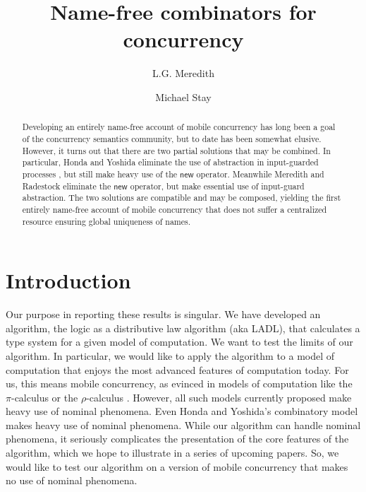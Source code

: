 \documentclass[submission,copyright,creativecommons]{eptcs}
\title{Name-free combinators for concurrency}
\author{L.G. Meredith
\institute{RChain Cooperative\\ Washington State}
\email{lgreg.meredith@rchain.coop}
\and
Michael Stay
\institute{Pyrofex Corp.\\Utah, USA}
\email{\quad stay@pyrofex.net}
}
\newcommand{\pic}{$\pi$-calculus}
\newcommand{\rhoc}{$\rho$-calculus}
\theoremstyle{definition}
\theoremstyle{remark}
\theoremstyle{remark}
\begin{document}
\maketitle
\begin{abstract}
\noindent
  Developing an entirely name-free account of mobile concurrency has
  long been a goal of the concurrency semantics community, but to date
  has been somewhat elusive. However, it turns out that there are two
  partial solutions that may be combined. In particular, Honda and
  Yoshida eliminate the use of abstraction in input-guarded processes
  \cite{DBLP:conf/popl/HondaY94,DBLP:journals/tcs/Yoshida02}, but
  still make heavy use of the $\mathsf{new}$ operator. Meanwhile
  Meredith and Radestock \cite{DBLP:journals/entcs/MeredithR05}
  eliminate the $\mathsf{new}$ operator, but make essential use of
  input-guard abstraction. The two solutions are compatible and may be
  composed, yielding the first entirely name-free account of mobile
  concurrency that does not suffer a centralized resource ensuring
  global uniqueness of names.
\end{abstract}

\section{Introduction}

Our purpose in reporting these results is singular. We have developed
an algorithm, the logic as a distributive law algorithm (aka LADL),
that calculates a type system for a given model of computation. We
want to test the limits of our algorithm. In particular, we would like
to apply the algorithm to a model of computation that enjoys the most
advanced features of computation today. For us, this means mobile
concurrency, as evinced in models of computation like the {\pic} or
the {\rhoc}
\cite{DBLP:conf/concur/Milner92,DBLP:journals/entcs/MeredithR05}.
However, all such models currently proposed make heavy use of nominal
phenomena. Even Honda and Yoshida's combinatory model
\cite{DBLP:conf/popl/HondaY94,DBLP:journals/tcs/Yoshida02}
makes heavy use of nominal phenomena. While our algorithm can handle
nominal phenomena, it seriously complicates the presentation of the
core features of the algorithm, which we hope to illustrate in a
series of upcoming papers. So, we would like to test our algorithm on
a version of mobile concurrency that makes no use of nominal
phenomena.
\end{document}
